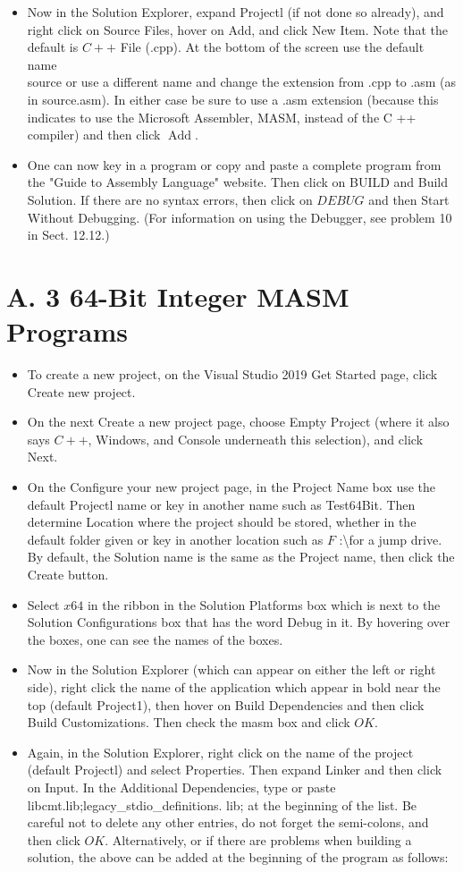 \documentclass[10pt]{article}
\begin{document}
\begin{itemize}
  \item Now in the Solution Explorer, expand Projectl (if not done so already), and right click on Source Files, hover on Add, and click New Item. Note that the default is $C++$ File (.cpp). At the bottom of the screen use the default name\\
source or use a different name and change the extension from .cpp to .asm (as in source.asm). In either case be sure to use a .asm extension (because this indicates to use the Microsoft Assembler, MASM, instead of the C ++ compiler) and then click $\operatorname{Add}$.
  \item One can now key in a program or copy and paste a complete program from the "Guide to Assembly Language" website. Then click on BUILD and Build Solution. If there are no syntax errors, then click on $D E B U G$ and then Start Without Debugging. (For information on using the Debugger, see problem 10 in Sect. 12.12.)
\end{itemize}

\section*{A. 3 64-Bit Integer MASM Programs}
\begin{itemize}
  \item To create a new project, on the Visual Studio 2019 Get Started page, click Create new project.
  \item On the next Create a new project page, choose Empty Project (where it also says $C++$, Windows, and Console underneath this selection), and click Next.
  \item On the Configure your new project page, in the Project Name box use the default Projectl name or key in another name such as Test64Bit. Then determine Location where the project should be stored, whether in the default folder given or key in another location such as $F$ :\textbackslash for a jump drive. By default, the Solution name is the same as the Project name, then click the Create button.
  \item Select $x 64$ in the ribbon in the Solution Platforms box which is next to the Solution Configurations box that has the word Debug in it. By hovering over the boxes, one can see the names of the boxes.
  \item Now in the Solution Explorer (which can appear on either the left or right side), right click the name of the application which appear in bold near the top (default Project1), then hover on Build Dependencies and then click Build Customizations. Then check the masm box and click $O K$.
  \item Again, in the Solution Explorer, right click on the name of the project (default Projectl) and select Properties. Then expand Linker and then click on Input. In the Additional Dependencies, type or paste libcmt.lib;legacy\_stdio\_definitions. lib; at the beginning of the list. Be careful not to delete any other entries, do not forget the semi-colons, and then click $O K$. Alternatively, or if there are problems when building a solution, the above can be added at the beginning of the program as follows:
\end{itemize}
\end{document}
